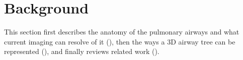 
\section{Background}                     %
\label{sec:background}                   %

This section first describes the anatomy of the pulmonary airways and what current imaging can
resolve of it (), then the ways a 3D airway tree can be represented
(), and finally reviews related work ().

